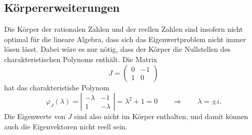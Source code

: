 \subsection{Körpererweiterungen}
Die Körper der rationalen Zahlen und der reellen Zahlen sind insofern
nicht optimal für die lineare Algebra, dass sich das Eigenwertproblem
nicht immer lösen lässt.
Dabei wäre es nur nötig, dass der Körper die Nullstellen des
charakteristischen Polynoms enthält. 
Die Matrix
\[
J=\begin{pmatrix}0&-1\\1&0\end{pmatrix}
\]
hat das charakteristishe Polynom
\[
\varphi_{J}(\lambda)
=
\left|\begin{matrix}-\lambda&-1\\1&-\lambda\end{matrix}\right|
=
\lambda^2+1 = 0
\qquad\Rightarrow\qquad
\lambda=\pm i.
\]
Die Eigenwerte von $J$ sind also nicht im Körper enthalten,
und damit können auch die Eigenvektoren nicht reell sein.

